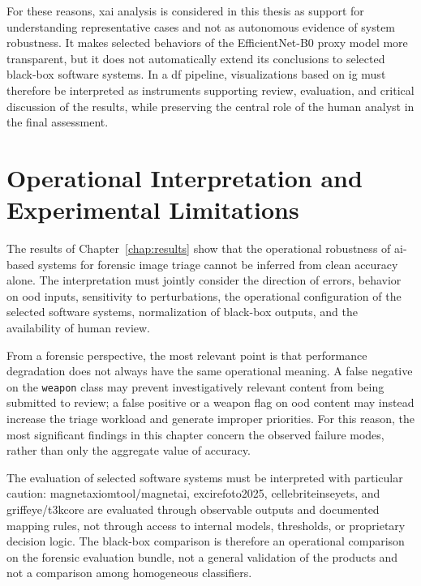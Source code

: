 For these reasons, \gls{xai} analysis is considered in this thesis as support
for understanding representative cases and not as autonomous evidence of system
robustness. It makes selected behaviors of the EfficientNet-B0 proxy model more
transparent, but it does not automatically extend its conclusions to selected
black-box software systems. In a \gls{df} pipeline, visualizations based on
\gls{ig} must therefore be interpreted as instruments supporting review,
evaluation, and critical discussion of the results, while preserving the central
role of the human analyst in the final assessment.

\section{Operational Interpretation and Experimental Limitations}
\label{sec:results-implications}

The results of Chapter~\ref{chap:results} show that the operational robustness
of \gls{ai}-based systems for forensic image triage cannot be inferred from
clean accuracy alone. The interpretation must jointly consider the direction of
errors, behavior on \gls{ood} inputs, sensitivity to perturbations, the
operational configuration of the selected software systems, normalization of
black-box outputs, and the availability of human review.

From a forensic perspective, the most relevant point is that performance
degradation does not always have the same operational meaning. A false negative
on the \texttt{weapon} class may prevent investigatively relevant content from
being submitted to review; a false positive or a weapon flag on \gls{ood}
content may instead increase the triage workload and generate improper
priorities. For this reason, the most significant findings in this chapter
concern the observed failure modes, rather than only the aggregate value of
accuracy.

The evaluation of selected software systems must be interpreted with particular
caution: \gls{magnetaxiomtool}/\gls{magnetai}, \gls{excirefoto2025},
\gls{cellebriteinseyets}, and \gls{griffeye}/\gls{t3kcore} are evaluated through
observable outputs and documented mapping rules, not through access to internal
models, thresholds, or proprietary decision logic. The black-box comparison is
therefore an operational comparison on the forensic evaluation bundle, not a
general validation of the products and not a comparison among homogeneous
classifiers.

